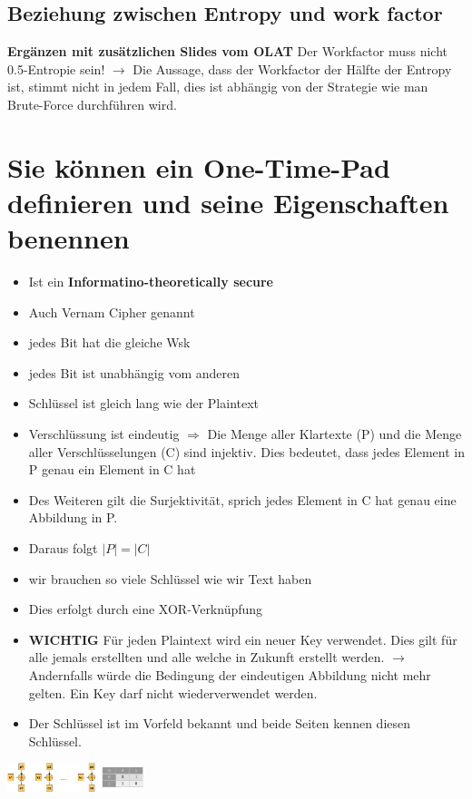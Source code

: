 \documentclass{report}
\newenvironment{Figure}
	{\par\medskip\noindent\minipage{\linewidth}}
	{\endminipage\par\medskip}
\theoremstyle{definition}
\theoremstyle{example}
\begin{document}
	\subsection{Beziehung zwischen Entropy und work factor}
\textbf{Ergänzen mit zusätzlichen Slides vom OLAT}
Der Workfactor muss nicht 0.5-Entropie sein! $\rightarrow$ Die Aussage, dass der Workfactor der Hälfte der Entropy ist, stimmt nicht in jedem Fall, dies ist abhängig von der Strategie wie man Brute-Force durchführen wird.

\section{Sie können ein One-Time-Pad definieren und seine Eigenschaften benennen}
\begin{itemize}
	\item Ist ein \textbf{Informatino-theoretically secure}
	\item Auch Vernam Cipher genannt
	\item jedes Bit hat die gleiche Wsk
	\item jedes Bit ist unabhängig vom anderen
	\item Schlüssel ist gleich lang wie der Plaintext
	\item Verschlüssung ist eindeutig $\Rightarrow$ Die Menge aller Klartexte (P) und die Menge aller Verschlüsselungen (C) sind injektiv. Dies bedeutet, dass jedes Element in P genau ein Element in C hat
	\item Des Weiteren gilt die Surjektivität, sprich jedes Element in C hat genau eine Abbildung in P.
	\item Daraus folgt $|P| = |C|$
	\item wir brauchen so viele Schlüssel wie wir Text haben
	\item Dies erfolgt durch eine XOR-Verknüpfung
	\item \textbf{WICHTIG} Für jeden Plaintext wird ein neuer Key verwendet. Dies gilt für alle jemals erstellten und alle welche in Zukunft erstellt werden. $\rightarrow$ Andernfalls würde die Bedingung der eindeutigen Abbildung nicht mehr gelten. Ein Key darf nicht wiederverwendet werden.
	\item Der Schlüssel ist im Vorfeld bekannt und beide Seiten kennen diesen Schlüssel.
\end{itemize}

\begin{Figure}
\centering
\includegraphics[width=150px]{img/OneTimePad.png}
	\label{fig:One Time Pad}
\end{Figure}
\end{document}
